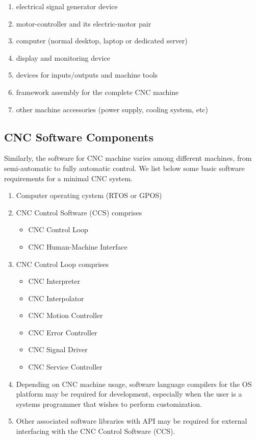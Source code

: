 \begin{enumerate}
	\item electrical signal generator device
	\item motor-controller and its electric-motor pair
	\item computer (normal desktop, laptop or dedicated server)
	\item display and monitoring device
	\item devices for inputs/outputs and machine tools
	\item framework assembly for the complete CNC machine
	\item other machine accessories (power supply, cooling system, etc)
\end{enumerate}

\subsection{CNC Software Components}
Similarly, the software for CNC machine varies among different machines, from semi-automatic to fully automatic control. We list below some basic software requirements for a minimal CNC system.

\begin{enumerate}
	\item Computer operating cystem (RTOS or GPOS)
	\item CNC Control Software (CCS) comprises 
	\begin{itemize}
		\item CNC Control Loop 
		\item CNC Human-Machine Interface
	\end{itemize}
	
	\item CNC Control Loop comprises 
		\begin{itemize}
			\item CNC Interpreter 
			\item CNC Interpolator
			\item CNC Motion Controller
			\item CNC Error Controller
			\item CNC Signal Driver
			\item CNC Service Controller
		\end{itemize}
		
	\item Depending on CNC machine usage, software language compilers for the OS platform may be required for development, especially when the user is a systems programmer that wishes to perform customization.
	\item Other associated software libraries with API may be required for external interfacing with the CNC Control Software (CCS).
	
\end{enumerate}

